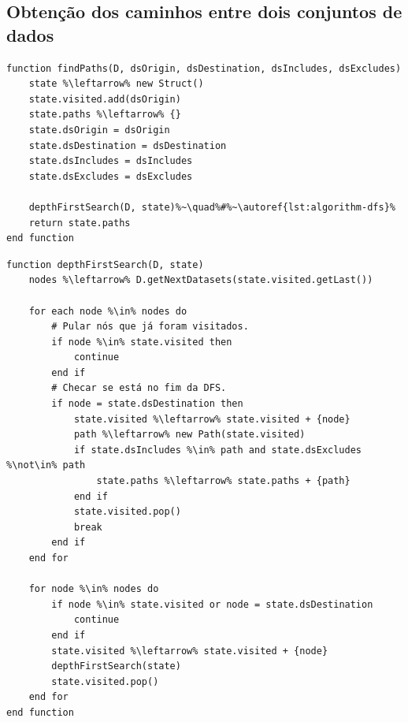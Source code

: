 
\subsection{Obtenção dos caminhos entre dois conjuntos de dados}


\begin{minipage}[c]{0.95\textwidth}
\begin{lstlisting}[language=pseudocode,label={lst:algorithm-find-paths},caption={[Obtenção dos caminhos entre dois conjuntos de dados.]Obtenção dos caminhos entre dois conjuntos de dados, inicializando a \textsc{DFS} com um estado inicial apropriado.}]
function findPaths(D, dsOrigin, dsDestination, dsIncludes, dsExcludes)
    state %\leftarrow% new Struct()
    state.visited.add(dsOrigin)
    state.paths %\leftarrow% {}
    state.dsOrigin = dsOrigin
    state.dsDestination = dsDestination
    state.dsIncludes = dsIncludes
    state.dsExcludes = dsExcludes

    depthFirstSearch(D, state)%~\quad%#%~\autoref{lst:algorithm-dfs}%
    return state.paths
end function
\end{lstlisting}
\end{minipage}

\begin{minipage}[c]{0.95\textwidth}
\begin{lstlisting}[language=pseudocode,label={lst:algorithm-dfs},caption={[Depth First Search (DFS)]Depth First Search (DFS): busca em profundidade dos caminhos entre dois conjuntos de dados.}]
function depthFirstSearch(D, state)
    nodes %\leftarrow% D.getNextDatasets(state.visited.getLast())
    
    for each node %\in% nodes do
        # Pular nós que já foram visitados.
        if node %\in% state.visited then
            continue
        end if
        # Checar se está no fim da DFS.
        if node = state.dsDestination then
            state.visited %\leftarrow% state.visited + {node}
            path %\leftarrow% new Path(state.visited)
            if state.dsIncludes %\in% path and state.dsExcludes %\not\in% path
                state.paths %\leftarrow% state.paths + {path}
            end if
            state.visited.pop()
            break
        end if
    end for
    
    for node %\in% nodes do
        if node %\in% state.visited or node = state.dsDestination
            continue
        end if
        state.visited %\leftarrow% state.visited + {node}
        depthFirstSearch(state)
        state.visited.pop()
    end for
end function
\end{lstlisting}
\end{minipage}

